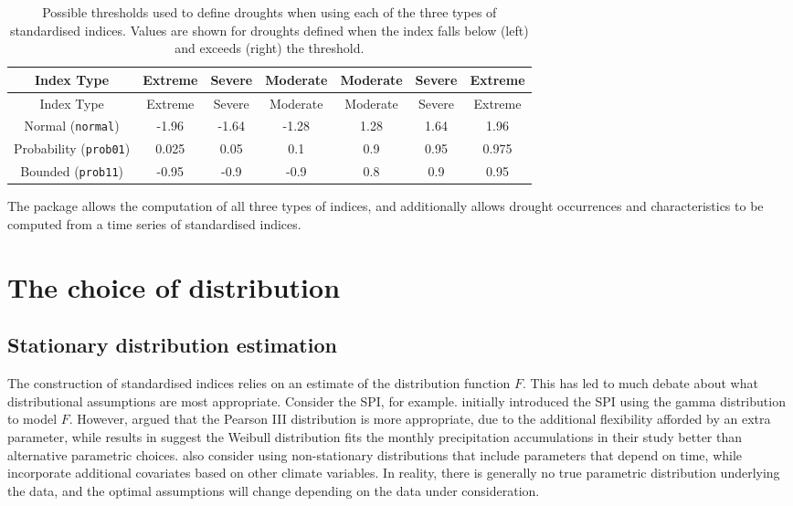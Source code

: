 \begin{longtable}[]{@{}ccccccc@{}}
\caption{\label{tab:unnamed-chunk-1}Possible thresholds used to define droughts when using each of the three types of standardised indices. Values are shown for droughts defined when the index falls below (left) and exceeds (right) the threshold.}\tabularnewline
\toprule\noalign{}
Index Type & Extreme & Severe & Moderate & Moderate & Severe & Extreme \\
\midrule\noalign{}
\endfirsthead
\toprule\noalign{}
Index Type & Extreme & Severe & Moderate & Moderate & Severe & Extreme \\
\midrule\noalign{}
\endhead
\bottomrule\noalign{}
\endlastfoot
Normal (\texttt{normal}) & -1.96 & -1.64 & -1.28 & 1.28 & 1.64 & 1.96 \\
Probability (\texttt{prob01}) & 0.025 & 0.05 & 0.1 & 0.9 & 0.95 & 0.975 \\
Bounded (\texttt{prob11}) & -0.95 & -0.9 & -0.9 & 0.8 & 0.9 & 0.95 \\
\end{longtable}

The  package allows the computation of all three types of indices, and additionally allows drought occurrences and characteristics to be computed from a time series of standardised indices.

\section{The choice of distribution}\label{the-choice-of-distribution}

\subsection{Stationary distribution estimation}\label{stationary-distribution-estimation}

The construction of standardised indices relies on an estimate of the distribution function \(F\). This has led to much debate about what distributional assumptions are most appropriate. Consider the SPI, for example. \cite{MckeeEtAl1993} initially introduced the SPI using the gamma distribution to model \(F\). However, \cite{Guttman1999} argued that the Pearson III distribution is more appropriate, due to the additional flexibility afforded by an extra parameter, while results in \cite{StaggeEtAl2015} suggest the Weibull distribution fits the monthly precipitation accumulations in their study better than alternative parametric choices. \cite{RussoEtAl2013} also consider using non-stationary distributions that include parameters that depend on time, while \cite{LiEtAl2015} incorporate additional covariates based on other climate variables. In reality, there is generally no true parametric distribution underlying the data, and the optimal assumptions will change depending on the data under consideration.

